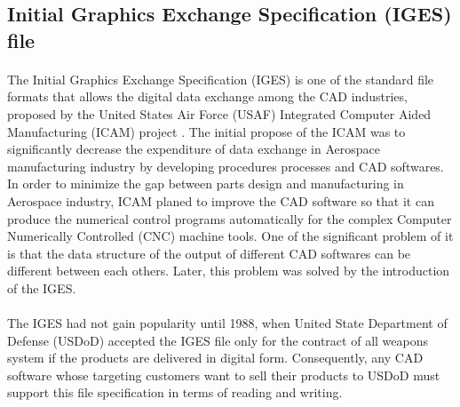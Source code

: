 \subsection{Initial Graphics Exchange Specification (IGES) file}
\label{lr_sec:IGES}
\paragraph{}
The Initial Graphics Exchange Specification (IGES) is one of the standard file formats that allows the digital data exchange among the CAD industries, proposed by the United States Air Force (USAF) Integrated Computer Aided Manufacturing (ICAM) project \citep{uspro2006}.
The initial propose of the ICAM was to significantly decrease the expenditure of data exchange in Aerospace manufacturing industry by developing procedures processes and CAD softwares.
In order to minimize the gap between parts design and manufacturing in Aerospace industry, ICAM planed to improve the CAD software so that it can produce the numerical control programs automatically for the complex Computer Numerically Controlled (CNC) machine tools.
One of the significant problem of it is that the data structure of the output of different CAD softwares can be different between each others.
Later, this problem was solved by the introduction of the IGES.
\paragraph{}
The IGES had not gain popularity until 1988, when United State Department of Defense (USDoD) accepted the IGES file only for the contract of all weapons system if the products are delivered in digital form.
Consequently, any CAD software whose targeting customers want to sell their products to USDoD must support this file specification in terms of reading and writing.


